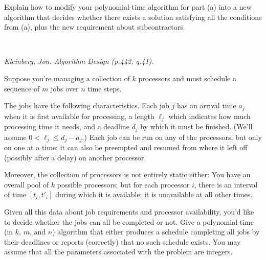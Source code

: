 \documentclass[solutionorbox,answers]{exam}
\begin{document}
\begin{questions}
\begin{parts}
Explain how to modify your polynomial-time algorithm for part
(a) into a new algorithm that decides whether there exists a solution
satisfying all the conditions from (a), plus the new requirement about
subcontractors.

\begin{solutionbox}{} \\

\end{solutionbox}

\end{parts}

\newpage

\question \textit{Kleinberg, Jon. Algorithm Design (p.442, q.41).} 

Suppose you're managing a collection of $k$ processors and must schedule a sequence of $m$ jobs over $n$ time steps.

The jobs have the following characteristics. Each job $j$ has an arrival
time $a_j$ when it is first available for processing, a length $\ell_j$ which indicates
how much processing time it needs, and a deadline $d_j$ by which it must
be finished. (We'll assume $0 < \ell_j \le d_j - a_j$.) Each job can be run on any
of the processors, but only on one at a time; it can also be preempted
and resumed from where it left off (possibly after a delay) on another
processor.

Moreover, the collection of processors is not entirely static either:
You have an overall pool of $k$ possible processors; but for each processor
$i$, there is an interval of time $[t_i , t'_i]$ during which it is available; it is
unavailable at all other times.

Given all this data about job requirements and processor availability,
you'd like to decide whether the jobs can all be completed or not. Give a
polynomial-time (in $k$, $m$, and $n$) algorithm that either produces a schedule completing all
jobs by their deadlines or reports (correctly) that no such schedule exists.
You may assume that all the parameters associated with the problem are
integers.
{\small
}
\end{questions}
\end{document}
